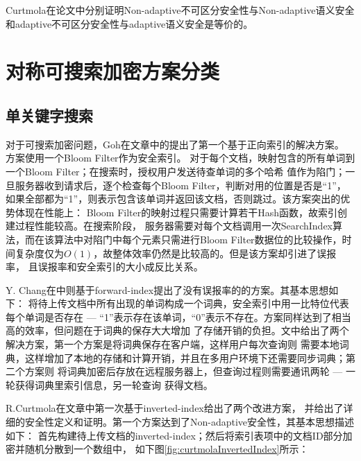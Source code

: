 Curtmola在论文\cite{curtmola2006searchable}中分别证明Non-adaptive不可区分安全性与Non-adaptive语义安全和adaptive不可区分安全性与adaptive语义安全是等价的。


\section{对称可搜索加密方案分类}
\label{sec:search_symm_symm}


\subsection{单关键字搜索}
\label{sec:search_symm_symm_exact}

对于可搜索加密问题，Goh在文章\cite{goh2003secure}中的提出了第一个基于正向索引的解决方案。
方案使用一个Bloom Filter\cite{gremillion1982designing}作为安全索引。
对于每个文档，映射包含的所有单词到一个Bloom Filter；在搜索时，授权用户发送待查单词的多个哈希
值作为陷门；一旦服务器收到请求后，逐个检查每个Bloom Filter，判断对用的位置是否是“1”，
如果全部都为“1”，则表示包含该单词并返回该文档，否则跳过。该方案突出的优势体现在性能上：
Bloom Filter的映射过程只需要计算若干Hash函数，故索引创建过程性能较高。在搜索阶段，
服务器需要对每个文档调用一次SearchIndex算法，而在该算法中对陷门中每个元素只需进行Bloom
Filter数据位的比较操作，时间复杂度仅为$O(1)$，故整体效率仍然是比较高的。但是该方案却引进了误报率，
且误报率和安全索引的大小成反比关系。

Y. Chang在\cite{chang2005privacy}中则基于forward-index提出了没有误报率的的方案。其基本思想如下：
将待上传文档中所有出现的单词构成一个词典，安全索引中用一比特位代表每个单词是否存在
--- “1”表示存在该单词，“0”表示不存在。方案同样达到了相当高的效率，但问题在于词典的保存大大增加
了存储开销的负担。文中给出了两个解决方案，第一个方案是将词典保存在客户端，这样用户每次查询则
需要本地词典，这样增加了本地的存储和计算开销，并且在多用户环境下还需要同步词典；第二个方案则
将词典加密后存放在远程服务器上，但查询过程则需要通讯两轮 --- 一轮获得词典里索引信息，另一轮查询
获得文档。

R.Curtmola在文章\cite{curtmola2006searchable}中第一次基于inverted-index给出了两个改进方案，
并给出了详细的安全性定义和证明。第一个方案达到了Non-adaptive安全性，其基本思想描述如下：
首先构建待上传文档的inverted-index；然后将索引表项中的文档ID部分加密并随机分散到一个数组中，
如下图\ref{fig:curtmolaInvertedIndex}所示：

